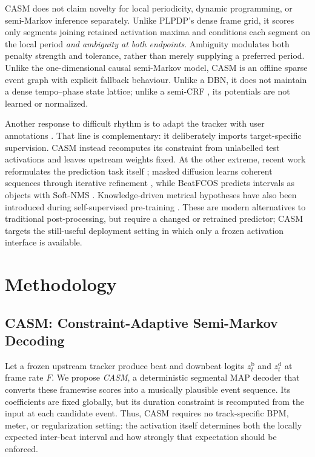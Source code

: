 \documentclass{article}
\begin{document}
CASM does not claim novelty for local periodicity, dynamic programming, or semi-Markov inference separately. Unlike PLPDP's dense frame grid, it scores only segments joining retained activation maxima and conditions each segment on the local period \emph{and ambiguity at both endpoints}. Ambiguity modulates both penalty strength and tolerance, rather than merely supplying a preferred period. Unlike the one-dimensional causal semi-Markov model, CASM is an offline sparse event graph with explicit fallback behaviour. Unlike a DBN, it does not maintain a dense tempo--phase state lattice; unlike a semi-CRF \cite{sarawagi2004semimarkov}, its potentials are not learned or normalized.

Another response to difficult rhythm is to adapt the tracker with user annotations \cite{pinto2021userdriven,maia2022adapting,pinto2023bridging, maia2024selective,pinto2026challenging}. That line is complementary: it deliberately imports target-specific supervision. CASM instead recomputes its constraint from unlabelled test activations and leaves upstream weights fixed. At the other extreme, recent work reformulates the prediction task itself \cite{bolt2026reformulated}; masked diffusion learns coherent sequences through iterative refinement \cite{foscarin2026masked}, while BeatFCOS predicts intervals as objects with Soft-NMS \cite{ahn2025beatfcos}. Knowledge-driven metrical hypotheses have also been introduced during self-supervised pre-training \cite{gagnere2025multiple}. These are modern alternatives to traditional post-processing, but require a changed or retrained predictor; CASM targets the still-useful deployment setting in which only a frozen activation interface is available.

\section{Methodology}
\label{sec:method}

\subsection{CASM: Constraint-Adaptive Semi-Markov Decoding}
\label{sec:casm}
Let a frozen upstream tracker produce beat and downbeat logits
$z_t^{\mathrm b}$ and $z_t^{\mathrm d}$ at frame rate $F$.  We propose
\emph{CASM}, a deterministic segmental MAP decoder that converts these
framewise scores into a musically plausible event sequence.  Its coefficients
are fixed globally, but its duration constraint is recomputed from the input at
each candidate event.  Thus, CASM requires no track-specific BPM, meter, or
regularization setting: the activation itself determines both the locally
expected inter-beat interval and how strongly that expectation should be
enforced.
\end{document}
